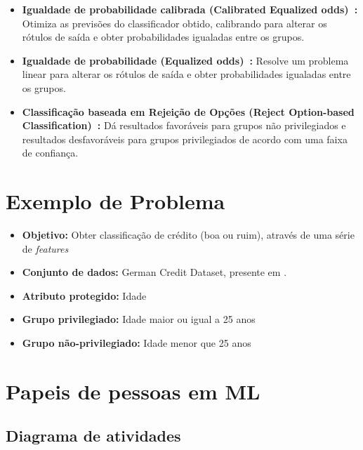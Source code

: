 \documentclass[portugues, 12pt, a4paper]{article}
\begin{document}
\begin{itemize}
\item \textbf{Igualdade de probabilidade calibrada (Calibrated Equalized odds)~\citep{Pleiss_2017}:} Otimiza as previsões do classificador obtido, calibrando para alterar os rótulos de saída e obter probabilidades igualadas entre os grupos.

\item \textbf{Igualdade de probabilidade (Equalized odds)~\citep{Hardt_2016}:} Resolve um problema linear para alterar os rótulos de saída e obter probabilidades igualadas entre os grupos.

\item \textbf{Classificação baseada em Rejeição de Opções (Reject Option-based Classification)~\citep{Kamiran_2012}:} Dá resultados favoráveis para grupos não privilegiados e resultados desfavoráveis para grupos privilegiados de acordo com uma faixa de confiança.

\end{itemize}

\section{Exemplo de Problema}

\begin{itemize}
\item \textbf{Objetivo:} Obter classificação de crédito (boa ou ruim), através de uma série de \textit{features}

\item \textbf{Conjunto de dados:} German Credit Dataset, presente em \citep{ucigerman_2021}.

\item \textbf{Atributo protegido:} Idade

\item \textbf{Grupo privilegiado:} Idade maior ou igual a 25 anos

\item \textbf{Grupo não-privilegiado:} Idade menor que 25 anos

\end{itemize}

\section{Papeis de pessoas em ML}

\subsection{Diagrama de atividades}
\end{document}
